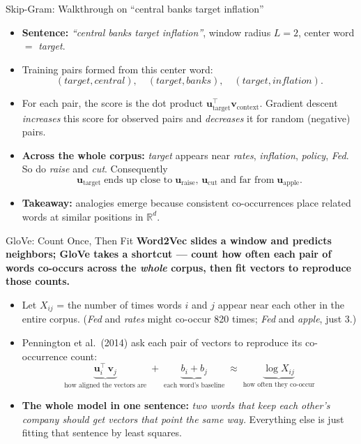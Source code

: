 \begin{frame}{Skip-Gram: Walkthrough on ``central banks target inflation''}
\begin{itemize}
\item \textbf{Sentence:} \emph{``central banks target inflation''}, window radius $L = 2$, center word $=$ \emph{target}.

\medskip
\item Training pairs formed from this center word:
\[
(\textit{target}, \textit{central}), \quad (\textit{target}, \textit{banks}), \quad (\textit{target}, \textit{inflation}).
\]

\medskip
\item For each pair, the score is the dot product $\mathbf{u}_{\text{target}}^{\top} \mathbf{v}_{\text{context}}$. Gradient descent \emph{increases} this score for observed pairs and \emph{decreases} it for random (negative) pairs.

\medskip
\item \textbf{Across the whole corpus:} \emph{target} appears near \emph{rates}, \emph{inflation}, \emph{policy}, \emph{Fed}. So do \emph{raise} and \emph{cut}. Consequently
\[
\mathbf{u}_{\text{target}} \;\text{ends up close to}\; \mathbf{u}_{\text{raise}},\, \mathbf{u}_{\text{cut}} \;\text{and far from}\; \mathbf{u}_{\text{apple}}.
\]

\medskip
\item \textbf{Takeaway:} analogies emerge because consistent co-occurrences place related words at similar positions in $\mathbb{R}^{d}$.
\end{itemize}
\end{frame}

\begin{frame}{GloVe: Count Once, Then Fit}
\textbf{Word2Vec slides a window and predicts neighbors; GloVe takes a shortcut --- count how often each pair of words co-occurs across the \emph{whole} corpus, then fit vectors to reproduce those counts.}
\medskip
\begin{itemize}
\item Let $X_{ij}$ = the number of times words $i$ and $j$ appear near each other in the entire corpus. (\emph{Fed} and \emph{rates} might co-occur 820 times; \emph{Fed} and \emph{apple}, just 3.)
\medskip
\item Pennington et al.\ (2014) ask each pair of vectors to reproduce its co-occurrence count:
\[
   \underbrace{\mathbf{u}_{i}^{\top}\,\mathbf{v}_{j}}_{\text{how aligned the vectors are}}
   \;+\; \underbrace{b_{i} + b_{j}}_{\text{each word's baseline}}
   \;\approx\; \underbrace{\log X_{ij}}_{\text{how often they co-occur}}
\]
\medskip
\item \textbf{The whole model in one sentence:} \emph{two words that keep each other's company should get vectors that point the same way.} Everything else is just fitting that sentence by least squares.
\end{itemize}
\end{frame}

